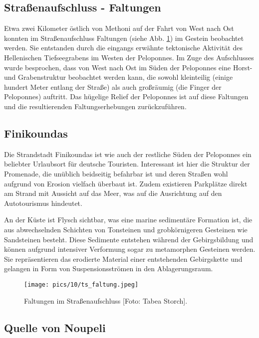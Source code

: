 \documentclass[preprint]{geomorphica} %
\begin{document}
\subsection{Straßenaufschluss - Faltungen}

Etwa zwei Kilometer östlich von Methoni auf der Fahrt von West nach Ost konnten im Straßenaufschluss Faltungen (siehe Abb. \ref{pic:faltungen}) im Gestein beobachtet werden. Sie entstanden durch die eingangs erwähnte tektonische Aktivität des Hellenischen Tiefseegrabens im Westen der Peloponnes. Im Zuge des Aufschlusses wurde besprochen, dass von West nach Ost im Süden der Peloponnes eine Horst- und Grabenstruktur beobachtet werden kann, die sowohl kleinteilig (einige hundert Meter entlang der Straße) als auch großräumig (die Finger der Peloponnes) auftritt. Das hügelige Relief der Peloponnes ist auf diese Faltungen und die resultierenden Faltungserhebungen zurückzuführen. 

\subsection{Finikoundas}

Die Strandstadt Finikoundas ist wie auch der restliche Süden der Peloponnes ein beliebter Urlaubsort für deutsche Touristen. Interessant ist hier die Struktur der Promenade, die unüblich beidseitig befahrbar ist und deren Straßen wohl aufgrund von Erosion vielfach überbaut ist. Zudem existieren Parkplätze direkt am Strand mit Aussicht auf das Meer, was auf die Ausrichtung auf den Autotourismus hindeutet.

An der Küste ist Flysch sichtbar, was eine marine sedimentäre Formation ist, die aus abwechselnden Schichten von Tonsteinen und grobkörnigeren Gesteinen wie Sandsteinen besteht. Diese Sedimente entstehen während der Gebirgsbildung und können aufgrund intensiver Verformung sogar zu metamorphen Gesteinen werden. Sie repräsentieren das erodierte Material einer entstehenden Gebirgskette und gelangen in Form von Suspensionsströmen in den Ablagerungsraum.

\begin{figure}[h]
    \centering
    \texttt{[image: pics/10/ts\_faltung.jpeg]}
    \caption{Faltungen im Straßenaufschluss [Foto: Tabea Storch].}
    \label{pic:faltungen}
\end{figure}

\subsection{Quelle von Noupeli}
\label{sec:noupeli}
\end{document}
